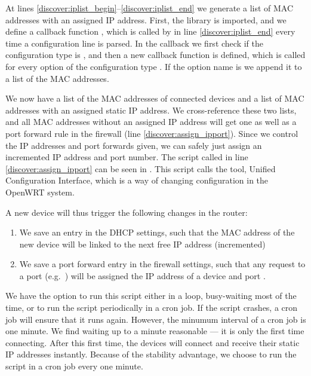 At lines \ref{discover:iplist_begin}--\ref{discover:iplist_end} we generate a list of MAC addresses with an assigned IP address. First, the  library is imported, and we define a callback function , which is called by  in line \ref{discover:iplist_end} every time a configuration line is parsed. In the callback we first check if the configuration type is , and then a new callback function  is defined, which is called for every option of the configuration type . If the option name is  we append it to a list of the MAC addresses.



We now have a list of the MAC addresses of connected devices and a list of MAC addresses with an assigned static IP address. We cross-reference these two lists, and all MAC addresses without an assigned IP address will get one as well as a port forward rule in the firewall (line \ref{discover:assign_ipport}). Since we control the IP addresses and port forwards given, we can safely just assign an incremented IP address and port number. The script called in line \ref{discover:assign_ipport} can be seen in . This script calls the  tool, Unified Configuration Interface, which is a way of changing configuration in the OpenWRT system.



A new device will thus trigger the following changes in the router:
\begin{enumerate}
  \item We save an entry in the DHCP settings, such that the MAC address of the new device will be linked to the next free IP address (incremented)
  \item We save a port forward entry in the firewall settings, such that any request to a port (e.g.\ ) will be assigned the IP address of a device and port .
\end{enumerate}

We have the option to run this script either in a loop, busy-waiting most of the time, or to run the script periodically in a cron job. If the script crashes, a cron job will ensure that it runs again. However, the minumum interval of a cron job is one minute. We find waiting up to a minute reasonable --- it is only the first time connecting. After this first time, the devices will connect and receive their static IP addresses instantly. Because of the stability advantage, we choose to run the script in a cron job every one minute.


